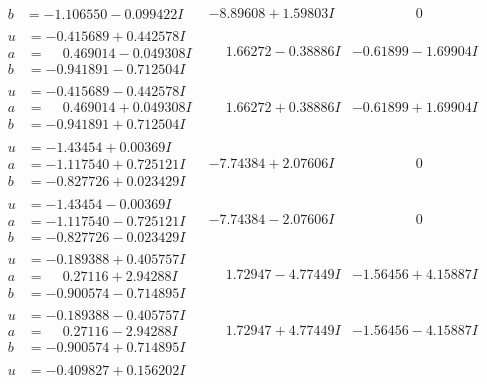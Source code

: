 \documentclass[1p]{elsarticle_modified}
\theoremstyle{definition}
\begin{document}
$$\begin{array}{c|c|c}
\begin{aligned}
b &= -1.106550 - 0.099422 I\end{aligned}
 & -8.89608 + 1.59803 I & \phantom{-0.000000 } 0 \\ \hline\begin{aligned}
u &= -0.415689 + 0.442578 I \\
a &= \phantom{-}0.469014 - 0.049308 I \\
b &= -0.941891 - 0.712504 I\end{aligned}
 & \phantom{-}1.66272 - 0.38886 I & -0.61899 - 1.69904 I \\ \hline\begin{aligned}
u &= -0.415689 - 0.442578 I \\
a &= \phantom{-}0.469014 + 0.049308 I \\
b &= -0.941891 + 0.712504 I\end{aligned}
 & \phantom{-}1.66272 + 0.38886 I & -0.61899 + 1.69904 I \\ \hline\begin{aligned}
u &= -1.43454 + 0.00369 I \\
a &= -1.117540 + 0.725121 I \\
b &= -0.827726 + 0.023429 I\end{aligned}
 & -7.74384 + 2.07606 I & \phantom{-0.000000 } 0 \\ \hline\begin{aligned}
u &= -1.43454 - 0.00369 I \\
a &= -1.117540 - 0.725121 I \\
b &= -0.827726 - 0.023429 I\end{aligned}
 & -7.74384 - 2.07606 I & \phantom{-0.000000 } 0 \\ \hline\begin{aligned}
u &= -0.189388 + 0.405757 I \\
a &= \phantom{-}0.27116 + 2.94288 I \\
b &= -0.900574 - 0.714895 I\end{aligned}
 & \phantom{-}1.72947 - 4.77449 I & -1.56456 + 4.15887 I \\ \hline\begin{aligned}
u &= -0.189388 - 0.405757 I \\
a &= \phantom{-}0.27116 - 2.94288 I \\
b &= -0.900574 + 0.714895 I\end{aligned}
 & \phantom{-}1.72947 + 4.77449 I & -1.56456 - 4.15887 I \\ \hline\begin{aligned}
u &= -0.409827 + 0.156202 I \\

\end{aligned}
\end{array}$$
\end{document}
